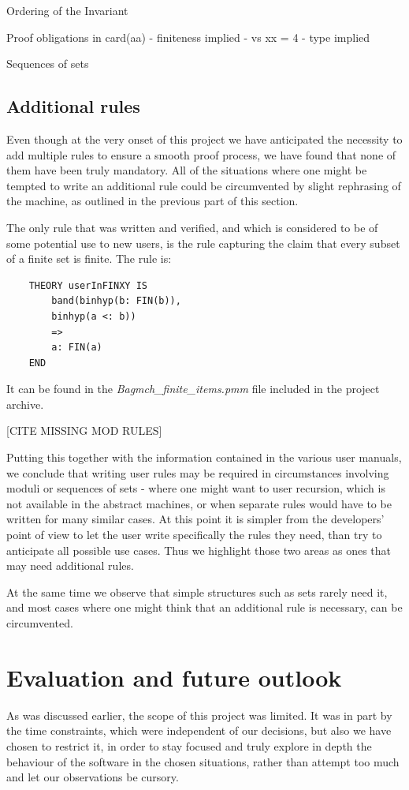 \documentclass[11pt,journal]{IEEEtran}
\begin{document}
	Ordering of the Invariant
	
	Proof obligations in card(aa) - finiteness implied - vs xx = 4 - type implied
	
	Sequences of sets
	
	\subsection{Additional rules}
	Even though at the very onset of this project we have anticipated the necessity to add multiple rules to ensure a smooth proof process, we have found that none of them have been truly mandatory. All of the situations where one might be tempted to write an additional rule could be circumvented by slight rephrasing of the machine, as outlined in the previous part of this section.
	
	The only rule that was written and verified, and which is considered to be of some potential use to new users, is the rule capturing the claim that every subset of a finite set is finite. The rule is:
	\begin{lstlisting}
	THEORY userInFINXY IS
		band(binhyp(b: FIN(b)), 
		binhyp(a <: b))
		=>
		a: FIN(a)
	END
	\end{lstlisting}
	It can be found in the \emph{Bagmch\_finite\_items.pmm} file included in the project archive.
	
	[CITE MISSING MOD RULES]
	
	Putting this together with the information contained in the various user manuals, we conclude that writing user rules may be required in circumstances involving moduli or sequences of sets - where one might want to user recursion, which is not available in the abstract machines, or when separate rules would have to be written for many similar cases. At this point it is simpler from the developers' point of view to let the user write specifically the rules they need, than try to anticipate all possible use cases. Thus we highlight those two areas as ones that may need additional rules.
	
	At the same time we observe that simple structures such as sets rarely need it, and most cases where one might think that an additional rule is necessary, can be circumvented.
	\section{Evaluation and future outlook}
	As was discussed earlier, the scope of this project was limited. It was in part by the time constraints, which were independent of our decisions, but also we have chosen to restrict it, in order to stay focused and truly explore in depth the behaviour of the software in the chosen situations, rather than attempt too much and let our observations be cursory.
	
\end{document}
